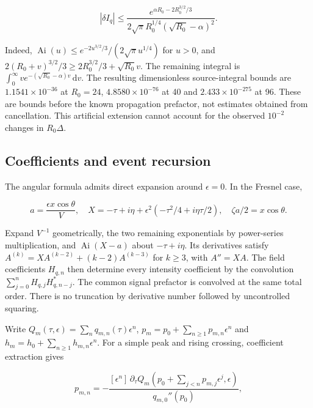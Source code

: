 \begin{equation}|\delta I_q|\leq\frac{e^{\alpha R_0-2R_0^{3/2}/3}}{2\sqrt\pi R_0^{1/4}(\sqrt{R_0}-\alpha)^2}.\end{equation}

Indeed, \(\operatorname{Ai}(u)\leq e^{-2u^{3/2}/3}/(2\sqrt\pi u^{1/4})\)
for \(u>0\), and \(2(R_0+v)^{3/2}/3\geq2R_0^{3/2}/3+\sqrt{R_0}v\). The
remaining integral is \(\int_0^\infty v e^{-(\sqrt{R_0}-\alpha)v}\,\mathrm{d}v\).
The resulting dimensionless source-integral bounds are
\(1.1541\times10^{-36}\) at \(R_0=24\), \(4.8580\times10^{-76}\) at 40
and \(2.433\times10^{-275}\) at 96. These are bounds before the known
propagation prefactor, not estimates obtained from cancellation. This
artificial extension cannot account for the observed \(10^{-2}\) changes
in \(R_0\Delta\).

\subsection{Coefficients and event
recursion}\label{coefficients-and-event-recursion}

The angular formula admits direct expansion around \(\epsilon=0\). In
the Fresnel case,

\begin{equation}a=\frac{\epsilon x\cos\theta}{V},\quad X=-\tau+i\eta+\epsilon^2(-\tau^2/4+i\eta\tau/2),\quad \zeta a/2=x\cos\theta.\end{equation}

Expand \(V^{-1}\) geometrically, the two remaining exponentials by
power-series multiplication, and \(\operatorname{Ai}(X-a)\) about
\(-\tau+i\eta\). Its derivatives satisfy
\(A^{(k)}=XA^{(k-2)}+(k-2)A^{(k-3)}\) for \(k\geq3\), with \(A''=XA\).
The field coefficients \(H_{q,n}\) then determine every intensity
coefficient by the convolution \(\sum_{j=0}^{n}H_{q,j}H_{q,n-j}^*\). The
common signal prefactor is convolved at the same total order. There is
no truncation by derivative number followed by uncontrolled squaring.

Write \(Q_m(\tau,\epsilon)=\sum_n q_{m,n}(\tau)\epsilon^n\),
\(p_m=p_0+\sum_{n\geq1}p_{m,n}\epsilon^n\) and
\(h_m=h_0+\sum_{n\geq1}h_{m,n}\epsilon^n\). For a simple peak and rising
crossing, coefficient extraction gives

\begin{equation}p_{m,n}=-\frac{[\epsilon^n]\,\partial_\tau Q_m(p_0+\sum_{j<n}p_{m,j}\epsilon^j,\epsilon)}{q_{m,0}''(p_0)},\end{equation}

